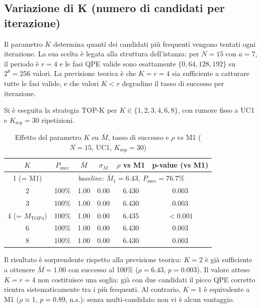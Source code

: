 \begin{onehalfspace}
\subsection{Variazione di K (numero di candidati per iterazione)}
\label{subsec:sweep_k}

Il parametro $K$ determina quanti dei candidati più frequenti vengono tentati ogni iterazione. La sua scelta è legata alla struttura dell'istanza: per $N=15$ con $a=7$, il periodo è $r=4$ e le fasi QPE valide sono esattamente $\{0, 64, 128, 192\}$ su $2^8 = 256$ valori. La previsione teorica è che $K = r = 4$ sia sufficiente a catturare tutte le fasi valide, e che valori $K < r$ degradino il tasso di successo per iterazione.

Si è eseguita la strategia TOP-K per $K \in \{1, 2, 3, 4, 6, 8\}$, con rumore fisso a UC1 e $K_{\text{rep}} = 30$ ripetizioni.

\begin{table}[H]
\centering
\caption{Effetto del parametro $K$ su $\bar{M}$, tasso di successo e $\rho$ vs M1 ($N=15$, UC1, $K_{\text{rep}}=30$)}
\label{tab:sweep_k}
\begin{tabular}{cccccc}
\hline
$K$ & $P_{\text{succ}}$ & $\bar{M}$ & $\sigma_M$ & $\rho$ vs M1 & p-value (vs M1) \\
\hline
1 (= M1)  & \multicolumn{5}{c}{\textit{baseline: $\bar{M}_1 = 6.43$, $P_{\text{succ}} = 76.7\%$}} \\
2         & 100\% & 1.00 & 0.00 & 6.430 & $0.003$ \\
3         & 100\% & 1.00 & 0.00 & 6.430 & $0.003$ \\
4 (= $M_{\text{TOP4}}$) & 100\% & 1.00 & 0.00 & 6.435 & ${<}0.001$ \\
6         & 100\% & 1.00 & 0.00 & 6.430 & $0.003$ \\
8         & 100\% & 1.00 & 0.00 & 6.430 & $0.003$ \\
\hline
\end{tabular}
\end{table}

Il risultato è sorprendente rispetto alla previsione teorica: $K=2$ è già sufficiente a ottenere $\bar{M}=1.00$ con successo al 100\% ($\rho=6.43$, $p=0.003$). Il valore atteso $K=r=4$ non costituisce una soglia: già con due candidati il picco QPE corretto rientra sistematicamente tra i più frequenti. Al contrario, $K=1$ è equivalente a M1 ($\rho \approx 1$, $p=0.89$, n.s.): senza multi-candidato non vi è alcun vantaggio.


\end{onehalfspace}
